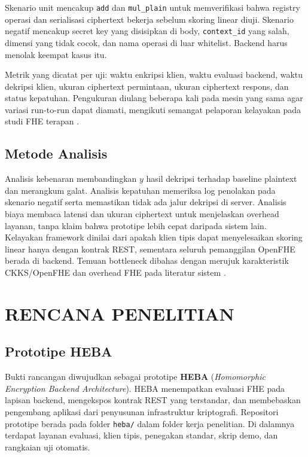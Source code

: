 \documentclass[12pt,a4paper,oneside]{report}
\begin{document}
Skenario unit mencakup \texttt{add} dan \texttt{mul\_plain} untuk memverifikasi bahwa registry operasi dan serialisasi ciphertext bekerja sebelum skoring linear diuji. Skenario negatif mencakup secret key yang disisipkan di body, \texttt{context\_id} yang salah, dimensi yang tidak cocok, dan nama operasi di luar whitelist. Backend harus menolak keempat kasus itu.

Metrik yang dicatat per uji: waktu enkripsi klien, waktu evaluasi backend, waktu dekripsi klien, ukuran ciphertext permintaan, ukuran ciphertext respons, dan status kepatuhan. Pengukuran diulang beberapa kali pada mesin yang sama agar variasi run-to-run dapat diamati, mengikuti semangat pelaporan kelayakan pada studi FHE terapan \cite{vinko2026secureByDesign,brynds2025cryptoracle}.

\section{Metode Analisis}

Analisis kebenaran membandingkan $y$ hasil dekripsi terhadap baseline plaintext dan merangkum galat. Analisis kepatuhan memeriksa log penolakan pada skenario negatif serta memastikan tidak ada jalur dekripsi di server. Analisis biaya membaca latensi dan ukuran ciphertext untuk menjelaskan overhead layanan, tanpa klaim bahwa prototipe lebih cepat daripada sistem lain. Kelayakan framework dinilai dari apakah klien tipis dapat menyelesaikan skoring linear hanya dengan kontrak REST, sementara seluruh pemanggilan OpenFHE berada di backend. Temuan bottleneck dibahas dengan merujuk karakteristik CKKS/OpenFHE dan overhead FHE pada literatur sistem \cite{brynds2025cryptoracle,li2026bootstrappingSurvey,fan2026gpuFhe}.

\chapter{RENCANA PENELITIAN}

\section{Prototipe HEBA}

Bukti rancangan diwujudkan sebagai prototipe \textbf{HEBA} (\emph{Homomorphic Encryption Backend Architecture}). HEBA menempatkan evaluasi FHE pada lapisan backend, mengekspos kontrak REST yang terstandar, dan membebaskan pengembang aplikasi dari penyusunan infrastruktur kriptografi. Repositori prototipe berada pada folder \texttt{heba/} dalam folder kerja penelitian. Di dalamnya terdapat layanan evaluasi, klien tipis, penegakan standar, skrip demo, dan rangkaian uji otomatis.
\end{document}
